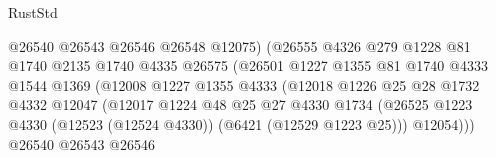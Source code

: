 \begin{lexlean}{RustStd}
\begin{coremodule}
                                          @26540
                                          @26543
                                          @26546
                                          @26548
                                          @12075)
                                        (@26555
                                          @4326
                                          @279
                                          @1228
                                          @81
                                          @1740
                                          @2135
                                          @1740
                                          @4335
                                          @26575
                                          (@26501
                                            @1227
                                            @1355
                                            @81
                                            @1740
                                            @4333
                                            @1544
                                            @1369
                                            (@12008
                                              @1227
                                              @1355
                                              @4333
                                              (@12018
                                                @1226
                                                @25
                                                @28
                                                @1732
                                                @4332
                                                @12047
                                                (@12017
                                                  @1224
                                                  @48
                                                  @25
                                                  @27
                                                  @4330
                                                  @1734
                                                  (@26525
                                                    @1223
                                                    @4330
                                                    (@12523 (@12524 @4330))
                                                    (@6421 (@12529 @1223 @25)))
                                                  @12054)))
                                            @26540
                                            @26543
                                            @26546

\end{coremodule}
\end{lexlean}
